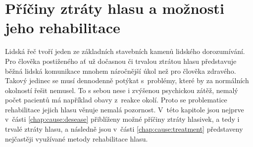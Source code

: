 \ifdefined\CELE
\else

\fi

\chapter{Příčiny ztráty hlasu a možnosti jeho rehabilitace}
\label{chap:cause}

Lidská řeč tvoří jeden ze základních stavebních kamenů lidského dorozumívání. Pro člověka
postiženého ať už dočasnou či trvalou ztrátou hlasu představuje běžná lidská
komunikace mnohem náročnější úkol než pro člověka zdravého. Takový jedinec se
musí dennodenně potýkat s~problémy, které by za normálních okolností řešit
nemusel. To s sebou nese %
i zvýšenou psychickou zátěž, nemalý počet pacientů má například obavy %
z~reakce okolí. Proto se problematice rehabilitace jejich
hlasu věnuje nemalá pozornost. V~této kapitole jsou nejprve v~části
\ref{chap:cause:desease} přiblíženy možné příčiny ztráty hlasivek, a tedy i
trvalé ztráty hlasu, a následně jsou v~části \ref{chap:cause:treatment} představeny
nejčastěji využívané metody rehabilitace hlasu.



% 
% 

\ifdefined\CELE
\else

\fi
